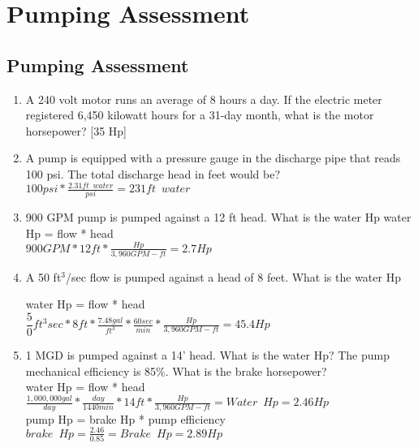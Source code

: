 
\chapter{Pumping Assessment}

\section*{Pumping Assessment}

\begin{enumerate}




\item A 240 volt motor runs an average of 8 hours a day.  If the electric meter registered 6,450 kilowatt hours for a 31-day month, what is the motor horsepower? [35 Hp]




\item A pump is equipped with a pressure gauge in the discharge pipe that reads 100 psi. The total discharge head in feet would be?\\
\vspace{0.4cm}
$100psi*\frac{2.31ft \enspace water}{psi}=\boxed{231ft \enspace water}$
\vspace{0.4cm}

\vspace{0.4cm}
\item 900 GPM pump is pumped against a 12 ft head.  What is the water Hp
\vspace{0.4cm}
water Hp = flow * head\\
$900GPM*12ft*\frac{Hp}{3,960 GPM-ft}=\boxed{2.7Hp}$

\item A 50 ft$^3$/sec flow is pumped against a head of 8 feet.  What is the water Hp

\vspace{0.4cm}
water Hp = flow * head\\
$\dfrac50{ft^3}{sec}*8ft*\frac{7.48 gal}{ft^3}*\frac{60sec}{min}*\frac{Hp}{3,960 GPM-ft}=\boxed{45.4Hp}$

\item 1 MGD is pumped against a 14’ head.  What is the water Hp?  The pump mechanical efficiency is 85\%.  What is the brake horsepower?\\
\vspace{0.4cm}
water Hp = flow * head\\
$\frac{1,000,000gal}{day}*\frac{day}{1440min}*14ft*\frac{Hp}{3,960 GPM-ft}=\boxed{Water \enspace Hp = 2.46Hp}$\\
\vspace{0.4cm}
pump Hp = brake Hp * pump efficiency\\
$brake \enspace Hp = \frac{2.46}{0.85}=\boxed{Brake \enspace Hp=2.89Hp}$



\end{enumerate}

